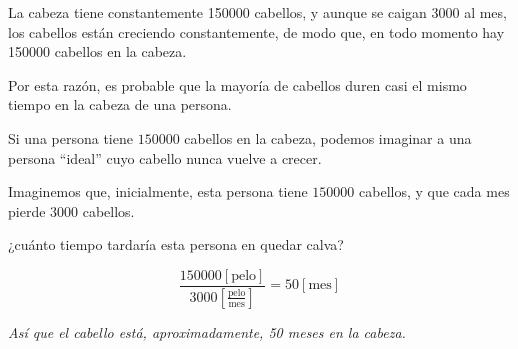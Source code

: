 La cabeza tiene constantemente 150000 cabellos, y aunque se caigan 3000 al mes, los cabellos están creciendo constantemente, de modo que, en todo momento hay 150000 cabellos en la cabeza.

Por esta razón, es probable que la mayoría de cabellos duren casi el mismo tiempo en la cabeza de una persona.

Si una persona tiene $150000$ cabellos en la cabeza, podemos imaginar a una persona ``ideal'' cuyo cabello nunca vuelve a crecer.

Imaginemos que, inicialmente, esta persona tiene $150000$ cabellos, y que cada mes pierde $3000$ cabellos.

¿cuánto tiempo tardaría esta persona en quedar calva?

\begin{equation*}
  \frac{150000 [\text{pelo}]}{3000[\frac{\text{pelo}}{\text{mes}}]} = 50 [\text{mes}]
\end{equation*}

\begin{center}
  \textit{Así que el cabello está, aproximadamente, 50 meses en la cabeza.}
\end{center}
